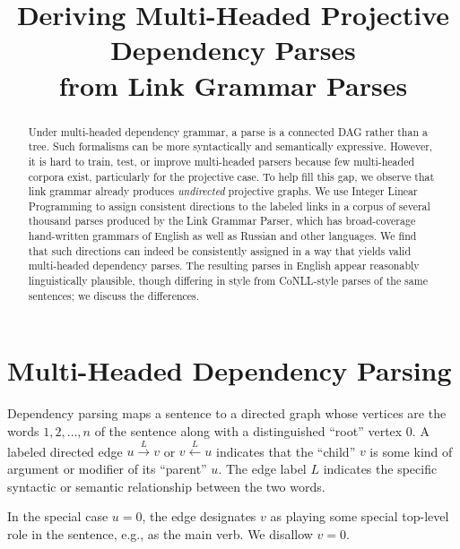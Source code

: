 \documentclass[11pt]{article}
\title{Deriving Multi-Headed Projective Dependency Parses \\ from Link Grammar Parses}
\date{}
\begin{document}
\maketitle

\begin{abstract}
Under multi-headed dependency grammar, a parse is a connected DAG rather than a tree.  Such formalisms can be more syntactically and semantically expressive.  However, 
it is hard to train, test, or improve multi-headed parsers because few multi-headed corpora exist, particularly for the projective case.
To help fill this gap, we observe that link grammar already produces {\em undirected} projective graphs.  
We use Integer Linear Programming to assign consistent directions to the labeled links in a corpus of several thousand parses produced by the Link Grammar Parser, which has broad-coverage hand-written grammars of English as well as Russian and other languages.  We find that such directions can indeed be consistently assigned in a way that yields valid multi-headed dependency parses. The resulting parses in English appear reasonably linguistically plausible, though differing in style from CoNLL-style parses of the same sentences; we discuss the differences.  
\end{abstract}

\section{Multi-Headed Dependency Parsing}

Dependency parsing maps a sentence to a directed graph whose vertices are the words $1, 2, \ldots, n$ of the sentence along with a distinguished ``root'' vertex 0.  A labeled directed edge $u \stackrel{L}{\rightarrow} v$ or $v \stackrel{L}{\leftarrow} u$ indicates that the ``child'' $v$ is some kind of argument or modifier of its ``parent'' $u$.  The edge label $L$ indicates the specific syntactic or semantic relationship between the two words.  

In the special case $u=0$, the edge designates $v$ as playing some special top-level role in the sentence, e.g., as the main verb.  We disallow $v=0$.
\end{document}

